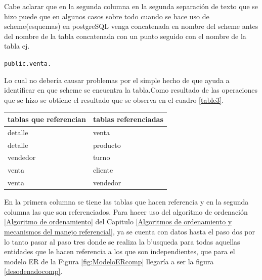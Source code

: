 Cabe aclarar que en la segunda columna en la segunda separaci\'on de texto que se hizo puede que en algunos casos sobre todo cuando se hace uso de scheme(esquemas) en postgreSQL venga concatenada en nombre del scheme antes del nombre de la tabla concatenada con un punto seguido con el nombre de la tabla ej.

\texttt{public.venta.}

Lo cual no deber\'ia  causar problemas por el simple hecho de que ayuda a identificar en que scheme se encuentra la tabla.Como resultado de las operaciones que se hizo se obtiene el resultado que se observa en el cuadro \ref{table3}.
\begin{center}
\scriptsize
  \renewcommand{\arrayrulewidth}{1pt}
  \label{table3} %
\begin{tabular}{|p{40mm}|p{98mm}|}
\hline
\textbf{tablas que referencian} & \textbf{tablas referenciadas} \\ \hline
detalle                         & venta                         \\ \hline
detalle                         & producto                      \\ \hline
vendedor                        & turno                         \\ \hline
venta                        & cliente                       \\ \hline
venta                           & vendedor                      \\ \hline
\end{tabular}
\end{center}
En la primera columna se tiene las tablas que hacen referencia y en la segunda columna las que son referenciados. Para hacer uso del algoritmo de ordenaci\'on \ref{Algoritmo de ordenamiento} del Capitulo \ref{Algoritmos de ordenamiento y mecanismos del manejo referencial},  ya se cuenta con datos hasta el paso dos por lo tanto pasar al paso tres donde se realiza la b'usqueda para todas aquellas entidades que le hacen referencia a los que son independientes, que para el modelo ER de la Figura \ref{fig:ModeloERcomp} llegar\'ia a ser la figura \ref{desodenadocomp}.
